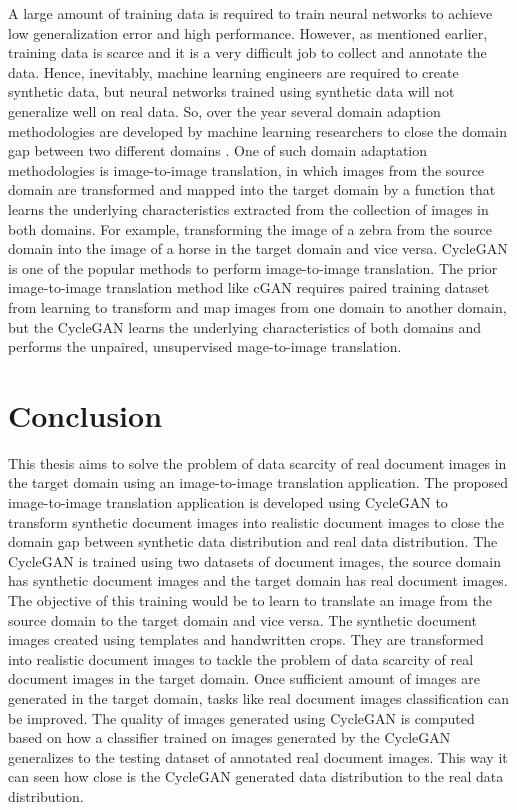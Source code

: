 A large amount of training data is required to train neural networks to achieve low generalization error and high performance. However, as mentioned earlier, training data is scarce and it is a very difficult job to collect and annotate the data. Hence, inevitably, machine learning engineers are required to create synthetic data, but neural networks trained using synthetic data will not generalize well on real data. So, over the year several domain adaption methodologies are developed by machine learning researchers to close the domain gap between two different domains \cite{farahani2020brief}. One of such domain adaptation methodologies is image-to-image translation, in which images from the source domain are transformed and mapped into the target domain by a function that learns the underlying characteristics extracted from the collection of images in both domains. For example, transforming the image of a zebra from the source domain into the image of a horse in the target domain and vice versa. \ac{CycleGAN} is one of the popular methods to perform image-to-image translation. The prior image-to-image translation method like \ac{cGAN} requires paired training dataset from learning to transform and map images from one domain to another domain, but the \ac{CycleGAN} learns the underlying characteristics of both domains and performs the unpaired, unsupervised mage-to-image translation.


\section{Conclusion}\label{Conclusion}

This thesis aims to solve the problem of data scarcity of real document images in the target domain using an image-to-image translation application. The proposed image-to-image translation application is developed using \ac{CycleGAN} to transform synthetic document images into realistic document images to close the domain gap between synthetic data distribution and real data distribution. The \ac{CycleGAN} is trained using two datasets of document images, the source domain has synthetic document images and the target domain has real document images. The objective of this training would be to learn to translate an image from the source domain to the target domain and vice versa. The synthetic document images created using templates and handwritten crops. They are transformed into realistic document images to tackle the problem of data scarcity of real document images in the target domain. Once sufficient amount of images are generated in the target domain, tasks like real document images classification can be improved. The quality of images generated using \ac{CycleGAN} is computed based on how a classifier trained on images generated by the \ac{CycleGAN} generalizes to the testing dataset of annotated real document images. This way it can seen how close is the \ac{CycleGAN} generated data distribution to the real data distribution.

